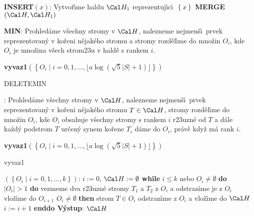 {\bf INSERT$\left(x\right)$}:\newline 
Vytvo\v r\'\i me haldu $\Cal H_1$ reprezentuj\'\i c\'\i\ $\left\{x\right\}$\newline 
{\bf MERGE}$\left(\Cal H,\Cal H_1\right)$
\bigskip

{\bf MIN}:\newline 
Prohled\'ame v\v sechny stromy v $\Cal H$, nalezneme nejmen\v s\'\i\ prvek 
repre\-zentovan\'y v ko\v reni n\v ejak\'eho stromu a stromy 
rozd\v el\'\i me do mno\v zin $O_i$, kde $O_i$ je mno\v zina v\v sech strom\accent23u 
v hald\v e s rankem $i$. \newline 
{\bf vyvaz1$\left(\left\{O_i\mid i=0,1,\dots,\lfloor a\log\left(\sqrt 5|S|+1\right)\rfloor 
\right\}\right)$
\bigskip

DELETEMIN}:\newline 
Prohled\'ame v\v sechny stromy v $\Cal H$, nalezneme nejmen\v s\'\i\ prvek 
repre\-zentovan\'y v ko\v reni n\v ejak\'eho stromu $T\in \Cal H$, stromy 
rozd\v e\-l\'\i me do mno\v zin $O_i$, kde $O_i$ obsahuje v\v sechny stromy  
s rankem $i$ r\accent23uzn\'e od $T$ a d\'ale ka\v zd\'y podstrom $T$ 
ur\v cen\'y synem ko\v rene $T_i$ d\'ame do $O_i$, pr\'av\v e kdy\v z m\'a rank $i$. \newline 
{\bf vyvaz1$\left(\left\{O_i\mid i=0,1,\dots,\lfloor a\log\left(\sqrt 5|S|+1\right)\rfloor 
\right\}\right)$
\bigskip

vyvaz1}$\left(\left\{O_i\mid i=0,1,\dots,k\right\}\right)$:\newline 
$i:=0$, $\Cal H:=\emptyset$\newline 
{\bf while} $i\le k$ nebo $O_i\ne\emptyset$ {\bf do}\newline 
\phantom{---}{\bf while} $|O_i|>1$ {\bf do\newline}
\phantom{------}vezmeme dva r\accent23uzn\'e stromy $T_1$ a $T_2$ z $O_i$ a 
odstran\'\i me je z $O_i$\newline 
\phantom{------}{\bf spoj$\left(T_1,T_2\right)$} vlo\v z\'\i me do $O_{i+1}$\newline 
\phantom{---}{\bf enddo}\newline 
\phantom{---}{\bf if} $O_i\ne\emptyset$ {\bf then}\newline 
\phantom{------}strom $T\in O_i$ odstran\'\i me z $O_i$ a vlo\v z\'\i me do $\Cal H$\newline 
\phantom{---}{\bf endif}\newline
\phantom{---}$i:=i+1$\newline 
{\bf enddo\newline 
V\'ystup}: $\Cal H$
\bigskip


